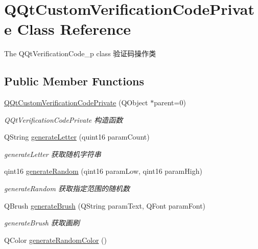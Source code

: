 \hypertarget{class_q_qt_custom_verification_code_private}{}\section{Q\+Qt\+Custom\+Verification\+Code\+Private Class Reference}
\label{class_q_qt_custom_verification_code_private}


The Q\+Qt\+Verification\+Code\+\_\+p class 验证码操作类  


\subsection*{Public Member Functions}
\begin{DoxyCompactItemize}
\item 
\mbox{\hyperlink{class_q_qt_custom_verification_code_private_a43eebe59ec9c2544aff984b5e211569d}{Q\+Qt\+Custom\+Verification\+Code\+Private}} (Q\+Object $\ast$parent=0)
\begin{DoxyCompactList}\small\item\em Q\+Qt\+Verification\+Code\+Private 构造函数 \end{DoxyCompactList}\item 
Q\+String \mbox{\hyperlink{class_q_qt_custom_verification_code_private_a6b3f8f71fbd5410622676fce6c84c1ee}{generate\+Letter}} (quint16 param\+Count)
\begin{DoxyCompactList}\small\item\em generate\+Letter 获取随机字符串 \end{DoxyCompactList}\item 
qint16 \mbox{\hyperlink{class_q_qt_custom_verification_code_private_a63dcbd61b6ff84a0b0d425b7f842cf54}{generate\+Random}} (qint16 param\+Low, qint16 param\+High)
\begin{DoxyCompactList}\small\item\em generate\+Random 获取指定范围的随机数 \end{DoxyCompactList}\item 
Q\+Brush \mbox{\hyperlink{class_q_qt_custom_verification_code_private_a730d6ed5d80cb956f7df2a8457d022a2}{generate\+Brush}} (Q\+String param\+Text, Q\+Font param\+Font)
\begin{DoxyCompactList}\small\item\em generate\+Brush 获取画刷 \end{DoxyCompactList}\item 
Q\+Color \mbox{\hyperlink{class_q_qt_custom_verification_code_private_a28a699e22baf587512d4274cef5c5a8d}{generate\+Random\+Color}} ()

\end{DoxyCompactItemize}
